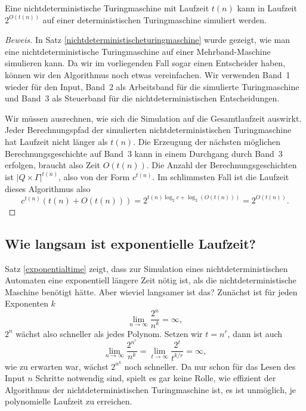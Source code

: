 \begin{satz}
\label{exponentialtime}
Eine nichtdeterministische Turingmaschine mit Laufzeit $t(n)$
kann in Laufzeit $2^{O(t(n))}$
auf einer deterministischen Turingmaschine simuliert werden.
\end{satz}

\begin{proof}[Beweis]
In Satz \ref{nichtdeterministischeturingmaschine} wurde gezeigt,
wie man eine nichtdeterministische Turingmaschine auf einer
Mehrband-Maschine simulieren kann. Da wir im vorliegenden Fall
sogar einen Entscheider haben, können wir den Algorithmus noch
etwas vereinfachen. Wir verwenden Band~1 wieder für den Input,
Band~2 als Arbeitsband für die simulierte Turingmaschine und
Band~3 als Steuerband für die nichtdeterministischen
Entscheidungen.

Wir müssen ausrechnen, wie sich die Simulation auf die 
Gesamtlaufzeit auswirkt. Jeder Berechnungspfad der simulierten
nichtdeterministischen Turingmaschine hat Laufzeit nicht
länger als $t(n)$. Die Erzeugung der nächsten möglichen
Berechnungsgeschichte auf Band~3 kann in einem Durchgang
durch Band~3 erfolgen, braucht also Zeit $O(t(n))$.
Die Anzahl der Berechnungsgeschichten ist $|Q\times \Gamma|^{t(n)}$,
also von der Form $c^{t(n)}$. Im schlimmsten Fall ist die
Laufzeit dieses Algorithmus also
\[
c^{t(n)}(t(n) + O(t(n)))
=
2^{t(n) \log_2 c+ \log_2(O(t(n)))}
=
2^{O(t(n))}.
\]
\end{proof}
\subsection{Wie langsam ist exponentielle Laufzeit?}
%
Satz \ref{exponentialtime} zeigt, dass zur Simulation eines
nichtdeterministischen Automaten eine exponentiell längere
Zeit nötig ist, als die nichtdeterministische Maschine
benötigt hätte. Aber wieviel langsamer ist das?
Zunächst ist für jeden Exponenten $k$
\[
\lim_{n\to\infty}\frac{2^{n}}{n^k}=\infty,
\]
$2^n$ wächst also schneller als jedes Polynom. 
Setzen wir $t=n^r$, dann ist auch
\[
\lim_{n\to\infty}\frac{2^{n^r}}{n^k}
=
\lim_{t\to\infty}\frac{2^t}{t^{k/r}}
=
\infty,
\]
wie zu erwarten war, wächst $2^{n^k}$ noch schneller.
Da nur schon für das Lesen des Input $n$ Schritte notwendig sind,
spielt es gar keine Rolle, wie effizient der Algorithmus der
nichtdeterministischen Turingmaschine ist, es ist unmöglich,
je polynomielle Laufzeit zu erreichen.

